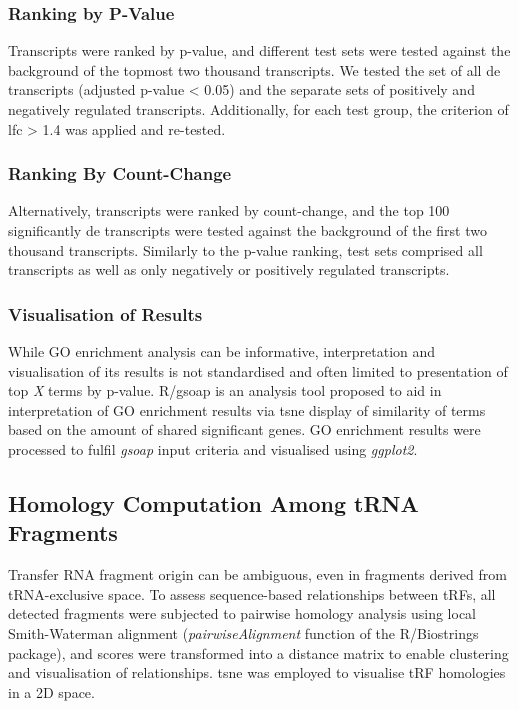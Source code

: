 \begin{method}
\subsubsection{Ranking by P-Value}
Transcripts were ranked by p-value, and different test sets were tested against the background of the topmost two thousand transcripts. We tested the set of all \ac{de} transcripts (adjusted p-value < 0.05) and the separate sets of positively and negatively regulated transcripts. Additionally, for each test group, the criterion of \ac{lfc} > 1.4 was applied and re-tested.

\subsubsection{Ranking By Count-Change}
Alternatively, transcripts were ranked by count-change, and the top 100 significantly \ac{de} transcripts were tested against the background of the first two thousand transcripts. Similarly to the p-value ranking, test sets comprised all transcripts as well as only negatively or positively regulated transcripts.

\subsubsection{Visualisation of Results}
While GO enrichment analysis can be informative, interpretation and visualisation of its results is not standardised and often limited to presentation of top \emph{X} terms by p-value. R/gsoap\cite{Tokar2020} is an analysis tool proposed to aid in interpretation of GO enrichment results via \acf{tsne} display of similarity of terms based on the amount of shared significant genes. GO enrichment results were processed to fulfil \emph{gsoap} input criteria and visualised using \emph{ggplot2}.\cite{Wickham2016}

\subsection{Homology Computation Among tRNA Fragments}
Transfer RNA fragment origin can be ambiguous, even in fragments derived from tRNA-exclusive space. To assess sequence-based relationships between tRFs, all detected fragments were subjected to pairwise homology analysis using local Smith-Waterman alignment (\emph{pairwiseAlignment} function of the R/Biostrings package), and scores were transformed into a distance matrix to enable clustering and visualisation of relationships. \ac{tsne} was employed to visualise tRF homologies in a 2D space.


\end{method}
